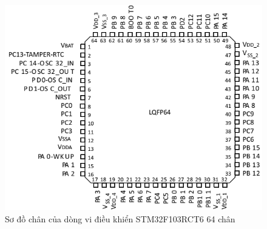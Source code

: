     \begin{figure}[h]
    \begin{center}
     \includegraphics[scale=0.4]{image/hinh2_10}
    \end{center}
    \caption{Sơ đồ chân của dòng vi điều khiển STM32F103RCT6 64 chân \cite{9}}
    \label{refhinh2_10}
    \end{figure}
